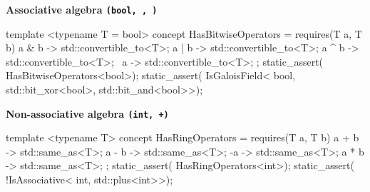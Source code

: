 \documentclass[11pt, a4paper]{article}
\begin{document}
\begin{table}[ht]
\label{tab:primitive-algebra}
\end{table}

\begin{listing}[ht]
\caption{Algebraic certification of the built-in primitives as type-checked code.
The s resolve the certifications listed in Table~\ref{tab:primitive-algebra} and can be applied regardless of provenance or lineage.
Left panel: case study of the primitive  type which is an exact model of the Galois field $\mathbb{F}_2$ over $\mathbb{B}$.
Right panel: case study of the primitive  type which is often used to mimick the ring $\mathbb{Z}$.
}
\label{lst:honest_rejection}
\noindent
\begin{minipage}[t]{0.48\linewidth}
\textbf{Associative algebra \texttt{(bool, \veebar, \land)}}
\begin{cpp}
template <typename T = bool>
concept HasBitwiseOperators =
requires(T a, T b) {
  { a & b } -> std::convertible_to<T>;
  { a | b } -> std::convertible_to<T>;
  { a ^ b } -> std::convertible_to<T>;
  { ~a    } -> std::convertible_to<T>;
};
static_assert(
  HasBitwiseOperators<bool>);
static_assert(
  IsGaloisField<
    bool,
    std::bit_xor<bool>,
    std::bit_and<bool>>);
\end{cpp}
\end{minipage}\hfill
\begin{minipage}[t]{0.48\linewidth}
\textbf{Non-associative algebra \texttt{(int, +)}}
\begin{cpp}
template <typename T>
concept HasRingOperators =
requires(T a, T b) {
  { a + b  } -> std::same_as<T>;
  { a - b  } -> std::same_as<T>;
  { -a     } -> std::same_as<T>;
  { a * b  } -> std::same_as<T>;
};
static_assert(
  HasRingOperators<int>); 
static_assert(
  !IsAssociative<
    int,
    std::plus<int>>);
\end{cpp}
\end{minipage}
\end{listing}
\end{document}
